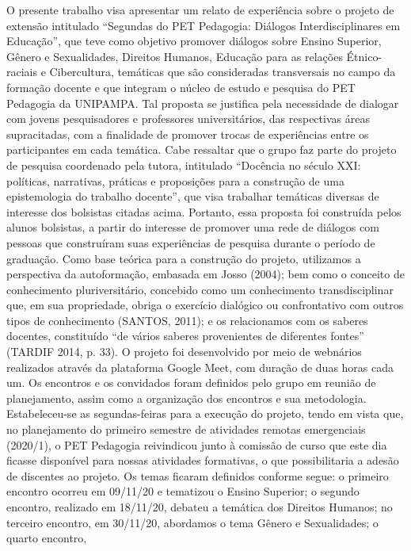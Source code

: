 O presente trabalho visa apresentar um relato de experiência sobre o projeto de extensão
intitulado “Segundas do PET Pedagogia: Diálogos Interdisciplinares em Educação”, que teve
como objetivo promover diálogos sobre Ensino Superior, Gênero e Sexualidades, Direitos
Humanos, Educação para as relações Étnico-raciais e Cibercultura, temáticas que são
consideradas transversais no campo da formação docente e que integram o núcleo de estudo e
pesquisa do PET Pedagogia da UNIPAMPA.
Tal proposta se justifica pela necessidade de dialogar com jovens pesquisadores e
professores universitários, das respectivas áreas supracitadas, com a finalidade de promover
trocas de experiências entre os participantes em cada temática. Cabe ressaltar que o grupo faz
parte do projeto de pesquisa coordenado pela tutora, intitulado “Docência no século XXI:
políticas, narrativas, práticas e proposições para a construção de uma epistemologia do trabalho
docente”, que visa trabalhar temáticas diversas de interesse dos bolsistas citadas acima. Portanto,
essa proposta foi construída pelos alunos bolsistas, a partir do interesse de promover uma rede de
diálogos com pessoas que construíram suas experiências de pesquisa durante o período de
graduação.
Como base teórica para a construção do projeto, utilizamos a perspectiva da
autoformação, embasada em Josso (2004); bem como o conceito de conhecimento
pluriversitário, concebido como um conhecimento transdisciplinar que, em sua propriedade,
obriga o exercício dialógico ou confrontativo com outros tipos de conhecimento (SANTOS,
2011); e os relacionamos com os saberes docentes, constituído “de vários saberes provenientes
de diferentes fontes” (TARDIF 2014, p. 33).
O projeto foi desenvolvido por meio de webnários realizados através da plataforma
Google Meet, com duração de duas horas cada um. Os encontros e os convidados foram
definidos pelo grupo em reunião de planejamento, assim como a organização dos encontros e sua
metodologia. Estabeleceu-se as segundas-feiras para a execução do projeto, tendo em vista que,
no planejamento do primeiro semestre de atividades remotas emergenciais (2020/1), o PET
Pedagogia reivindicou junto à comissão de curso que este dia ficasse disponível para nossas
atividades formativas, o que possibilitaria a adesão de discentes ao projeto. Os temas ficaram
definidos conforme segue: o primeiro encontro ocorreu em 09/11/20 e tematizou o Ensino
Superior; o segundo encontro, realizado em 18/11/20, debateu a temática dos Direitos Humanos;
no terceiro encontro, em 30/11/20, abordamos o tema Gênero e Sexualidades; o quarto encontro,
